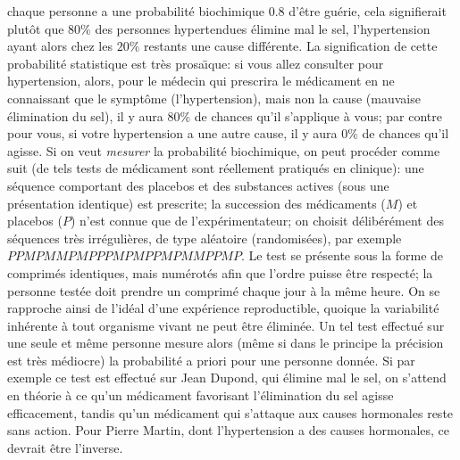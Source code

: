chaque personne a une probabilit\'e biochimique $0.8$ d'\^etre gu\'erie, 
cela signifierait plut\^ot que $80\%$ des personnes hypertendues 
\'elimine mal le sel, l'hypertension ayant alors chez les $20\%$ restants 
une cause diff\'erente. La signification de cette probabilit\'e statistique 
est tr\`es prosa{\"\i}que: si vous allez consulter pour hypertension, alors, 
pour le m\'edecin qui prescrira le m\'edicament en ne connaissant que le 
sympt\^ome (l'hypertension), mais non la cause (mauvaise \'elimination 
du sel), il y aura $80\%$ de chances qu'il s'applique \`a vous; par contre 
pour vous, si votre hypertension a une autre cause, il y aura $0\%$ de 
chances qu'il agisse. 
\medskip 
Si on veut {\it mesurer} la probabilit\'e biochimique, on peut 
proc\'eder comme suit (de tels tests de m\'edicament sont r\'eellement 
pratiqu\'es en clinique): une s\'equence comportant des placebos et des 
substances actives (sous une pr\'esentation identique) est prescrite; la 
succession des m\'edicaments ($M$) et placebos ($P$) n'est connue que
de l'exp\'erimentateur; on choisit d\'elib\'er\'ement des s\'equences 
tr\`es irr\'eguli\`eres, de type al\'eatoire (randomis\'ees), par exemple 
$PPMP MMPM PPPM PMPP MPMM PPMP$. 
\medskip 
Le test se pr\'esente sous la forme de comprim\'es identiques, mais 
num\'erot\'es afin que l'ordre puisse \^etre respect\'e; la personne 
test\'ee doit prendre un comprim\'e chaque jour \`a la m\^eme heure. On 
se rapproche ainsi de l'id\'eal d'une exp\'erience reproductible, quoique 
la variabilit\'e inh\'erente \`a tout organisme vivant ne peut \^etre 
\'elimin\'ee. Un tel test effectu\'e sur une seule et m\^eme personne 
mesure alors (m\^eme si dans le principe la pr\'ecision est tr\`es 
m\'ediocre) la probabilit\'e a priori pour une personne donn\'ee. Si par 
exemple ce test est effectu\'e sur Jean Dupond, qui \'elimine mal le
sel, on s'attend en th\'eorie \`a ce qu'un m\'edicament favorisant 
l'\'elimination du sel agisse efficacement, tandis qu'un m\'edicament 
qui s'attaque aux causes hormonales reste sans action.  Pour Pierre
Martin, dont l'hypertension a des causes hormonales, ce devrait \^etre 
l'inverse. 
\medskip 
